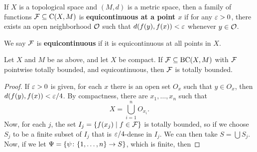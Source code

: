 \begin{definition}
    If $X$ is a topological space and $(M, d)$ is a metric space, then a family of functions $\mathcal F \subseteq \mathrm C(X, M)$ is \textbf{equicontinuous at a point $x$} if for any $\varepsilon > 0$, there exists an open neighborhood $\mathcal O$ such that $d(f(y), f(x)) < \varepsilon$ whenever $y \in \mathcal O$.

    We say $\mathcal F$ is \textbf{equicontinuous} if it is equicontinuous at all points in $X$.
\end{definition}

\begin{theorem}
    Let $X$ and $M$ be as above, and let $X$ be compact. If $\mathcal F \subseteq \mathrm{BC}(X, M)$ with $\mathcal F$ pointwise totally bounded, and equicontinuous, then $\mathcal F$ is totally bounded.
\end{theorem}

\begin{proof}
    If $\varepsilon > 0$ is given, for each $x$ there is an open set $O_x$ such that $y \in O_x$, then $d(f(y), f(x)) < \varepsilon/4$. By compactness, there are $x_1, \dots, x_n$ such that \[X = \bigcup_{i = 1}^n O_{x_i}.\] Now, for each $j$, the set $I_j = \qty{f(x_j) \mid f \in \mathcal F}$ is totally bounded, so if we choose $S_j$ to be a finite subset of $I_j$ that is $\varepsilon/4$-dense in $I_j$. We can then take $S = \bigcup S_j$. Now, if we let $\Psi= \qty{\psi \colon \qty{1, \dots, n} \to S}$, which is finite, then 
\end{proof}